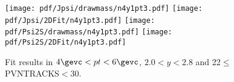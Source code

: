 \begin{figure}[H]
\begin{center}
\texttt{[image: pdf/Jpsi/drawmass/n4y1pt3.pdf]}
\texttt{[image: pdf/Jpsi/2DFit/n4y1pt3.pdf]}
\vspace*{-0.5cm}
\texttt{[image: pdf/Psi2S/drawmass/n4y1pt3.pdf]}
\texttt{[image: pdf/Psi2S/2DFit/n4y1pt3.pdf]}
\vspace*{-0.5cm}
\end{center}
\caption{Fit results in $4\gevc<pt<6\gevc$, $2.0<y<2.8$ and 22$\leq$PVNTRACKS$<$30.}
\label{Fitn4y1pt3}
\end{figure}

